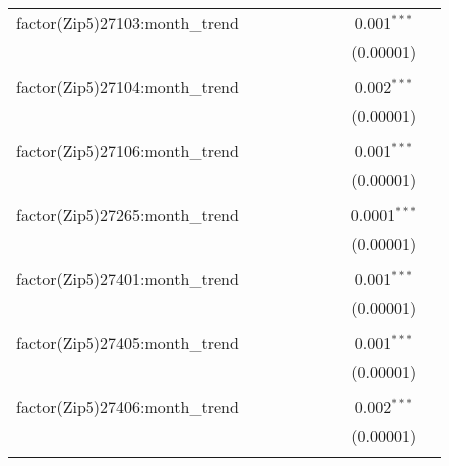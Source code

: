 \begin{table}[H]
{\begin{tabular}{@{\extracolsep{5pt}}lcccccccc}
  factor(Zip5)27103:month\_trend &  &  &  &  &  &  & 0.001$^{***}$ &  \\  

   &  &  &  &  &  &  & (0.00001) &  \\  

   & & & & & & & & \\  

  factor(Zip5)27104:month\_trend &  &  &  &  &  &  & 0.002$^{***}$ &  \\  

   &  &  &  &  &  &  & (0.00001) &  \\  

   & & & & & & & & \\  

  factor(Zip5)27106:month\_trend &  &  &  &  &  &  & 0.001$^{***}$ &  \\  

   &  &  &  &  &  &  & (0.00001) &  \\  

   & & & & & & & & \\  

  factor(Zip5)27265:month\_trend &  &  &  &  &  &  & 0.0001$^{***}$ &  \\  

   &  &  &  &  &  &  & (0.00001) &  \\  

   & & & & & & & & \\  

  factor(Zip5)27401:month\_trend &  &  &  &  &  &  & 0.001$^{***}$ &  \\  

   &  &  &  &  &  &  & (0.00001) &  \\  

   & & & & & & & & \\  

  factor(Zip5)27405:month\_trend &  &  &  &  &  &  & 0.001$^{***}$ &  \\  

   &  &  &  &  &  &  & (0.00001) &  \\  

   & & & & & & & & \\  

  factor(Zip5)27406:month\_trend &  &  &  &  &  &  & 0.002$^{***}$ &  \\  

   &  &  &  &  &  &  & (0.00001) &  \\  

   & & & & & & & & \\  


\end{tabular}}
\end{table}
